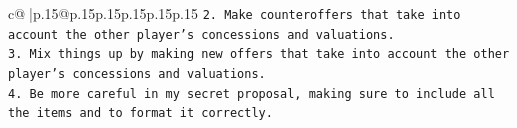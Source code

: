 \documentclass{article}
\begin{document}
{\begin{supertabular}{c@{$\;$}|p{.15\linewidth}@{}p{.15\linewidth}p{.15\linewidth}p{.15\linewidth}p{.15\linewidth}p{.15\linewidth}}
{{{\texttt{2. Make counteroffers that take into account the other player's concessions and valuations.} \\
\texttt{3. Mix things up by making new offers that take into account the other player's concessions and valuations.} \\
\texttt{4. Be more careful in my secret proposal, making sure to include all the items and to format it correctly.} \\
            }
        }
    }
     \\ \\

\end{supertabular}
}
\end{document}
